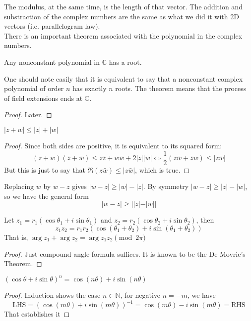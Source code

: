 The modulus, at the same time, is the length of that vector.
The addition and substraction of the complex numbers are the same as what we did it with 2D vectors (i.e. parallelogram law).\\
There is an important theorem associated with the polynomial in the complex numbers.
\begin{theorem}
    Any nonconstant polynomial in $\mathbb C$ has a root.
\end{theorem}
One should note easily that it is equivalent to say that a nonconstant complex polynomial of order $n$ has exactly $n$ roots.
The theorem means that the process of field extensions ends at $\mathbb C$.
\begin{proof}
    Later.
\end{proof}
\begin{proposition}
    $|z+w|\le |z|+|w|$
\end{proposition}
\begin{proof}
    Since both sides are positive, it is equivalent to its squared form:
    $$(z+w)(\bar z+\bar w)\le z\bar z+w\bar w+2|z||w|\iff \frac{1}{2}(z\bar w+\bar zw)\le |z\bar w|$$
    But this is just to say that $\Re (z\bar w)\le |z\bar w|$, which is true.
\end{proof}
\begin{corollary}
    Replacing $w$ by $w-z$ gives $|w-z|\ge |w|-|z|$.
    By symmetry $|w-z|\ge |z|-|w|$, so we have the general form
    $$|w-z|\ge||z|-|w||$$
\end{corollary}
\begin{proposition}
    Let $z_1=r_1(\cos \theta_1+i\sin\theta_1)$ and $z_2=r_2(\cos\theta_2+i\sin\theta_2)$, then
    $$z_1z_2=r_1r_2(\cos(\theta_1+\theta_2)+i\sin(\theta_1+\theta_2))$$
    That is, $\arg z_1+\arg z_2=\arg z_1z_2\pmod{2\pi}$
\end{proposition}
\begin{proof}
    Just compound angle formula suffices.
    It is known to be the De Movrie's Theorem.
\end{proof}
\begin{corollary}
    $(\cos\theta+i\sin\theta)^n=\cos(n\theta)+i\sin(n\theta)$
\end{corollary}
\begin{proof}
    Induction shows the case $n\in\mathbb N$, for negative $n=-m$, we have
    $$\text{LHS}=(\cos(m\theta)+i\sin(m\theta))^{-1}=\cos(m\theta)-i\sin(m\theta)=\text{RHS}$$
    That establishes it
\end{proof}
